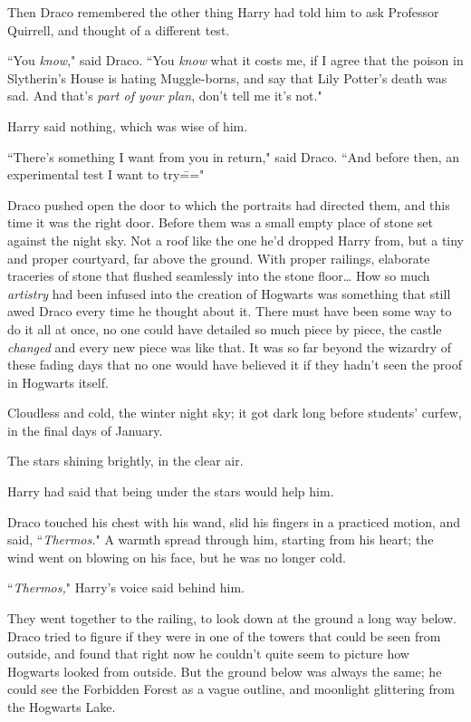 Then Draco remembered the other thing Harry had told him to ask Professor Quirrell, and thought of a different test.

``You \emph{know}," said Draco. ``You \emph{know} what it costs me, if I agree that the poison in Slytherin's House is hating Muggle-borns, and say that Lily Potter's death was sad. And that's \emph{part of your plan}, don't tell me it's not."

Harry said nothing, which was wise of him.

``There's something I want from you in return," said Draco. ``And before then, an experimental test I want to try\==="

\later

Draco pushed open the door to which the portraits had directed them, and this time it was the right door. Before them was a small empty place of stone set against the night sky. Not a roof like the one he'd dropped Harry from, but a tiny and proper courtyard, far above the ground. With proper railings, elaborate traceries of stone that flushed seamlessly into the stone floor{\ldots} How so much \emph{artistry} had been infused into the creation of Hogwarts was something that still awed Draco every time he thought about it. There must have been some way to do it all at once, no one could have detailed so much piece by piece, the castle \emph{changed} and every new piece was like that. It was so far beyond the wizardry of these fading days that no one would have believed it if they hadn't seen the proof in Hogwarts itself.

Cloudless and cold, the winter night sky; it got dark long before students' curfew, in the final days of January.

The stars shining brightly, in the clear air.

Harry had said that being under the stars would help him.

Draco touched his chest with his wand, slid his fingers in a practiced motion, and said, ``\emph{Thermos.}" A warmth spread through him, starting from his heart; the wind went on blowing on his face, but he was no longer cold.

``\emph{Thermos,}" Harry's voice said behind him.

They went together to the railing, to look down at the ground a long way below. Draco tried to figure if they were in one of the towers that could be seen from outside, and found that right now he couldn't quite seem to picture how Hogwarts looked from outside. But the ground below was always the same; he could see the Forbidden Forest as a vague outline, and moonlight glittering from the Hogwarts Lake.

